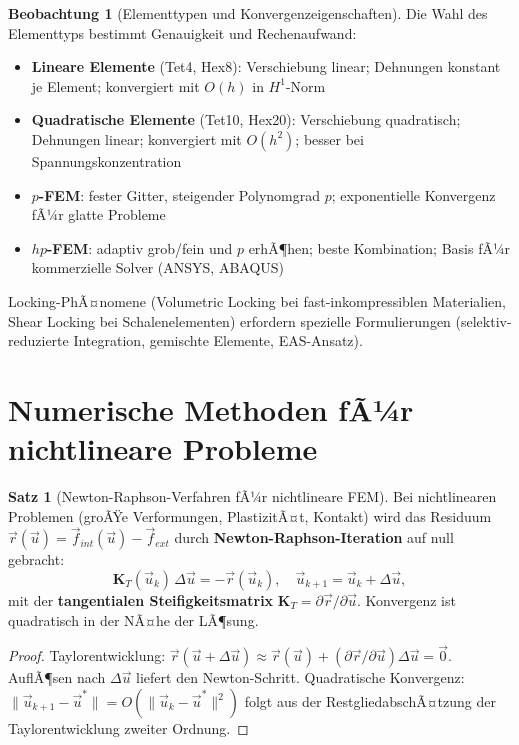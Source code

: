 ﻿\documentclass[a4paper,12pt]{report}
\theoremstyle{definition}
\newtheorem{satz}{Satz}
\newtheorem{beobachtung}{Beobachtung}
\begin{document}
\begin{beobachtung}[Elementtypen und Konvergenzeigenschaften]
Die Wahl des Elementtyps bestimmt Genauigkeit und Rechenaufwand:
\begin{itemize}
    \item[-] \textbf{Lineare Elemente} (Tet4, Hex8): Verschiebung linear;
          Dehnungen konstant je Element; konvergiert mit $O(h)$ in $H^1$-Norm
    \item[-] \textbf{Quadratische Elemente} (Tet10, Hex20): Verschiebung quadratisch;
          Dehnungen linear; konvergiert mit $O(h^2)$; besser bei Spannungskonzentration
    \item[-] \textbf{$p$-FEM}: fester Gitter, steigender Polynomgrad $p$;
          exponentielle Konvergenz fÃ¼r glatte Probleme
    \item[-] \textbf{$hp$-FEM}: adaptiv grob/fein und $p$ erhÃ¶hen;
          beste Kombination; Basis fÃ¼r kommerzielle Solver (ANSYS, ABAQUS)
\end{itemize}
Locking-PhÃ¤nomene (Volumetric Locking bei fast-inkompressiblen Materialien,
Shear Locking bei Schalenelementen) erfordern spezielle Formulierungen
(selektiv-reduzierte Integration, gemischte Elemente, EAS-Ansatz).
\end{beobachtung}

\section{Numerische Methoden fÃ¼r nichtlineare Probleme}

\begin{satz}[Newton-Raphson-Verfahren fÃ¼r nichtlineare FEM]
Bei nichtlinearen Problemen (groÃŸe Verformungen, PlastizitÃ¤t, Kontakt)
wird das Residuum $\vec{r}(\vec{u}) = \vec{f}_{int}(\vec{u}) - \vec{f}_{ext}$
durch \textbf{Newton-Raphson-Iteration} auf null gebracht:
\[
  \mathbf{K}_T(\vec{u}_k)\,\Delta\vec{u} = -\vec{r}(\vec{u}_k),
  \quad \vec{u}_{k+1} = \vec{u}_k + \Delta\vec{u},
\]
mit der \textbf{tangentialen Steifigkeitsmatrix}
$\mathbf{K}_T = \partial\vec{r}/\partial\vec{u}$.
Konvergenz ist quadratisch in der NÃ¤he der LÃ¶sung.
\end{satz}
\begin{proof}
Taylorentwicklung: $\vec{r}(\vec{u}+\Delta\vec{u}) \approx \vec{r}(\vec{u})
+ (\partial\vec{r}/\partial\vec{u})\Delta\vec{u} = \vec{0}$.
AuflÃ¶sen nach $\Delta\vec{u}$ liefert den Newton-Schritt.
Quadratische Konvergenz: $\|\vec{u}_{k+1}-\vec{u}^*\| = O(\|\vec{u}_k-\vec{u}^*\|^2)$
folgt aus der RestgliedabschÃ¤tzung der Taylorentwicklung zweiter Ordnung.
\end{proof}
\end{document}
